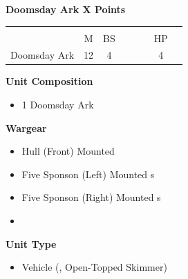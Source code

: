 \subsubsection[Doomsday Ark]{}
\hspace{0.5em}
\begin{minipage}[t]{0.72\textwidth}
	{\large \textbf{Doomsday Ark \dotfill X Points}}
	\begin{NiceTabular}{m{145 pt} *{2}{c} | *{3}{c} | c | c }
		& & &  & & & &  \\
		& M & BS &  &  &  & HP &  \\
		\hline
		Doomsday Ark & 12 & 4 &  &  &  & 4 & \\
	\end{NiceTabular}
	\small
	\begin{minipage}[t]{0.5\textwidth}
		\begin{flushleft}
			\vspace*{2em}
			\textbf{Unit Composition}
			\begin{itemize}
				\item 1 Doomsday Ark
			\end{itemize}
			
			\textbf{Wargear}
			\begin{itemize}
				\item Hull (Front) Mounted 
				\item Five Sponson (Left) Mounted s
				\item Five Sponson (Right) Mounted s
				\item {}
			\end{itemize}
		\end{flushleft}
	\end{minipage}
	\begin{minipage}[t]{0.5\textwidth}
		\begin{flushleft}
			\vspace*{2em}
			\textbf{Unit Type}
			\begin{itemize}
				\item Vehicle (, Open-Topped Skimmer)
			\end{itemize}
			

\end{flushleft}
\end{minipage}
\end{minipage}
